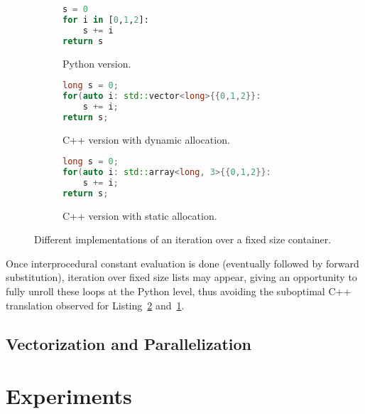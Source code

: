 \documentclass[10pt, preprint]{sigplanconf}
\begin{document}
\begin{figure}

    \begin{subfigure}{.5\textwidth}
    \begin{lstlisting}[language=python]
s = 0
for i in [0,1,2]:
    s += i
return s
\end{lstlisting}
\caption{Python version.}
\end{subfigure}

    \begin{subfigure}{.5\textwidth}
\begin{lstlisting}[language=c++]
long s = 0;
for(auto i: std::vector<long>{{0,1,2}}:
    s += i;
return s;
\end{lstlisting}
\caption{C++ version with dynamic allocation.}
\label{lst:dyna}
\end{subfigure}

    \begin{subfigure}{.5\textwidth}
\begin{lstlisting}[language=c++]
long s = 0;
for(auto i: std::array<long, 3>{{0,1,2}}:
    s += i;
return s;
\end{lstlisting}
\caption{C++ version with static allocation.}
\label{lst:stat}
\end{subfigure}

    \caption{Different implementations of an iteration over a fixed size container.}
    \label{fig:unroll-range}

\end{figure}

Once interprocedural constant evaluation is done (eventually followed by
forward substitution), iteration over fixed size lists may appear, giving an
opportunity to fully unroll these loops at the Python level, thus avoiding the
suboptimal C++ translation observed for Listing~\ref{lst:stat}
and~\ref{lst:dyna}.

\subsection{Vectorization and Parallelization}

\cite{esterie2012boost, pyhpc2013, wpmvp2014}

\section{Experiments}
\label{sec:xp}

\end{document}
